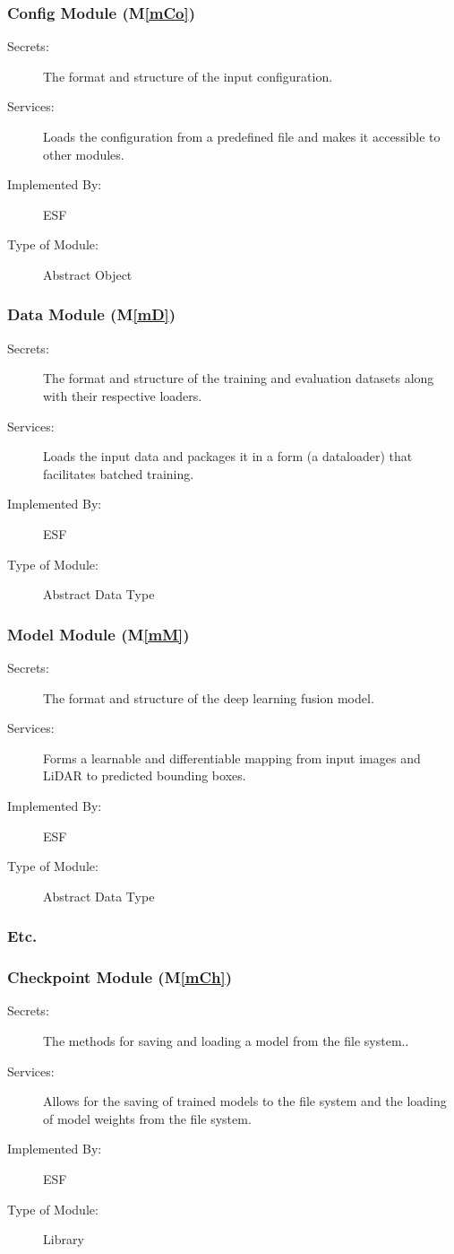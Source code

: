\documentclass[12pt, titlepage]{article}
\newcommand{\ProjectName}{ESF }
\newcommand{\mref}[1]{M\ref{#1}}
\begin{document}
\subsubsection{Config Module (\mref{mCo})}
\begin{description}
\item[Secrets:] The format and structure of the input configuration.
\item[Services:] Loads the configuration from a predefined file and makes it accessible to other modules.
\item[Implemented By:] \ProjectName{} 
\item[Type of Module:] Abstract Object
\end{description}

\subsubsection{Data Module (\mref{mD})}
\begin{description}
\item[Secrets:] The format and structure of the training and evaluation datasets along with their respective loaders.
\item[Services:] Loads the input data and packages it in a form (a dataloader) that facilitates batched training.
\item[Implemented By:] \ProjectName{}
\item[Type of Module:] Abstract Data Type
\end{description}

\subsubsection{Model Module (\mref{mM})}
\begin{description}
\item[Secrets:] The format and structure of the deep learning fusion model.
\item[Services:] Forms a learnable and differentiable mapping from input images and LiDAR to predicted bounding boxes.
\item[Implemented By:] \ProjectName{}
\item[Type of Module:] Abstract Data Type
\end{description}
\subsubsection{Etc.}

\subsubsection{Checkpoint Module (\mref{mCh})}
\begin{description}
\item[Secrets:] The methods for saving and loading a model from the file system..
\item[Services:] Allows for the saving of trained models to the file system and the loading of model weights from the file system.
\item[Implemented By:] \ProjectName{}
\item[Type of Module:] Library
\end{description}
\end{document}
